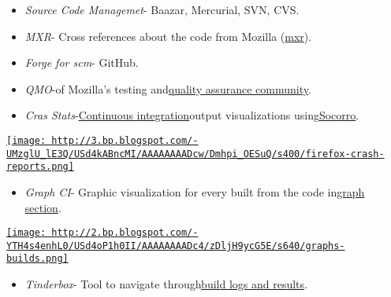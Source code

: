 \begin{itemize}
	\item \textit{Source Code Managemet}\nolinebreak- Baazar, Mercurial, SVN, CVS.
	\item \textit{MXR}\nolinebreak- Cross references about the code from Mozilla (\href{http://mxr.mozilla.org/}{mxr}).
	\item \textit{Forge for scm}\nolinebreak- GitHub.
	\item \textit{QMO}\nolinebreak-\nolinebreakHome of Mozilla's testing and\nolinebreak\href{http://quality.mozilla.org/}{quality assurance community}.
	\item \textit{Cras Stats}\nolinebreak-\nolinebreak\href{http://graphs.mozilla.org/#displayrange=7&amp;branch=Firefox&amp;platform=%5B%22Windows+7%22%2C%22Windows+XP%22%2C%22Mac+OS+X%22%2C%22Linux%22%5D&amp;test=%5B%22Ts%22%2C%22Tp%22%2C%22SunSpider%22%5D}{Continuous integration}\nolinebreakserver output visualizations using\nolinebreak\href{https://github.com/mozilla/socorro}{Socorro}.
\end{itemize}\href{http://3.bp.blogspot.com/-UMzglU_lE3Q/USd4kABncMI/AAAAAAAADcw/Dmhpi_OESuQ/s1600/firefox-crash-reports.png}{
\texttt{[image: http://3.bp.blogspot.com/-UMzglU\_lE3Q/USd4kABncMI/AAAAAAAADcw/Dmhpi\_OESuQ/s400/firefox-crash-reports.png]}}
\\
\begin{itemize}
	\item \textit{Graph CI}\nolinebreak- Graphic visualization for every built from the code in\nolinebreak\href{http://graphs.mozilla.org/}{graph section}.
\end{itemize}\href{http://2.bp.blogspot.com/-YTH4s4enhL0/USd4oP1h0II/AAAAAAAADc4/zDljH9ycG5E/s1600/graphs-builds.png}{
\texttt{[image: http://2.bp.blogspot.com/-YTH4s4enhL0/USd4oP1h0II/AAAAAAAADc4/zDljH9ycG5E/s640/graphs-builds.png]}}
\\
\begin{itemize}
	\item \textit{Tinderbox}\nolinebreak- Tool to navigate through\nolinebreak\href{http://tinderbox.mozilla.org/showbuilds.cgi}{build logs and results}.
\end{itemize}

